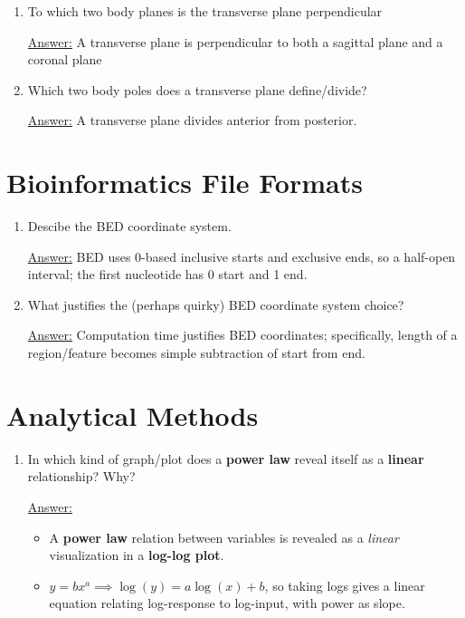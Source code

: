 \documentclass{article}
\newenvironment{QandA}{\begin{enumerate}[label=\bfseries Q\arabic*.]}
                       {\end{enumerate}}
\newenvironment{answered}{\par\normalfont\underline{Answer:}}{}
\begin{document}
\begin{QandA}
    \begin{answered}
    The sagittal plane defines/divides the left and right. Any non-median sagittal plane implies a lateral vs. medial division.
    \end{answered}
  \item{To which two body planes is the transverse plane perpendicular}
    \begin{answered}
    A transverse plane is perpendicular to both a sagittal plane and a coronal plane
    \end{answered}
  \item{Which two body poles does a transverse plane define/divide?}
    \begin{answered}
    A transverse plane divides anterior from posterior.
    \end{answered}
\end{QandA}
\section{Bioinformatics File Formats}
\begin{QandA}
  \item{Descibe the BED coordinate system.}
    \begin{answered}
    BED uses 0-based inclusive starts and exclusive ends, so a half-open interval; the first nucleotide has 0 start and 1 end.
    \end{answered}
  \item{What justifies the (perhaps quirky) BED coordinate system choice?}
    \begin{answered}
    Computation time justifies BED coordinates; specifically, length of a region/feature becomes simple subtraction of start from end.
    \end{answered}
\end{QandA}
\section{Analytical Methods}
\begin{QandA}
  \item{In which kind of graph/plot does a \textbf{power law} reveal itself as a \textbf{linear} relationship? Why?}
    \begin{answered}
    \begin{itemize}
      \item{A \textbf{power law} relation between variables is revealed as a \textit{linear} visualization in a \textbf{log-log plot}.}
      \item{$y = b x^a \implies \operatorname{log}(y) = a \operatorname{log}(x) + b$, so taking logs gives a linear equation relating log-response to log-input, with power as slope.}
    \end{itemize}
    \end{answered}
\end{QandA}
\end{document}
